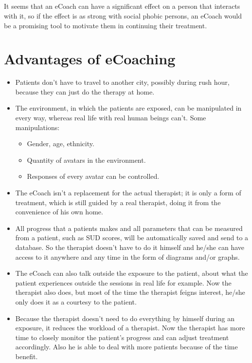 \documentclass[english,a4paper,pdftex]{report}
\begin{document}
\paragraph{}
It seems that an eCoach can have a significant effect on a person that interacts with it, so if the effect is as strong with social phobic persons, an eCoach would be a promising tool to motivate them in continuing their treatment.



\chapter{Advantages of eCoaching}
\begin{itemize}
\item Patients don't have to travel to another city, possibly during rush hour, because they can just do the therapy at home.
\item The environment, in which the patients are exposed, can be manipulated in every way, whereas real life with real human beings can't. 
Some manipulations:
	\begin{itemize}
	\item Gender, age, ethnicity.
	\item Quantity of avatars in the environment.
	\item Responses of every avatar can be controlled.
	\end{itemize}
\item The eCoach isn't a replacement for the actual therapist; it is only a form of treatment, which is still guided by a real therapist, doing it from the convenience of his own home.
\item All progress that a patients makes and all parameters that can be measured from a patient, such as SUD scores, will be automatically saved and send to a database. So the therapist doesn't have to do it himself and he/she can have access to it anywhere and any time in the form of diagrams and/or graphs.
\item The eCoach can also talk outside the exposure to the patient, about what the patient experiences outside the sessions in real life for example. Now the therapist also does, but most of the time the therapist feigns interest, he/she only does it as a courtesy to the patient.
\item Because the therapist doesn't need to do everything by himself during an exposure, it reduces the workload of a therapist. Now the therapist has more time to closely monitor the patient's progress and can adjust treatment accordingly.  Also he is able to deal with more patients because of the time benefit.\cite{ter2011design}
\end{itemize}
\end{document}
